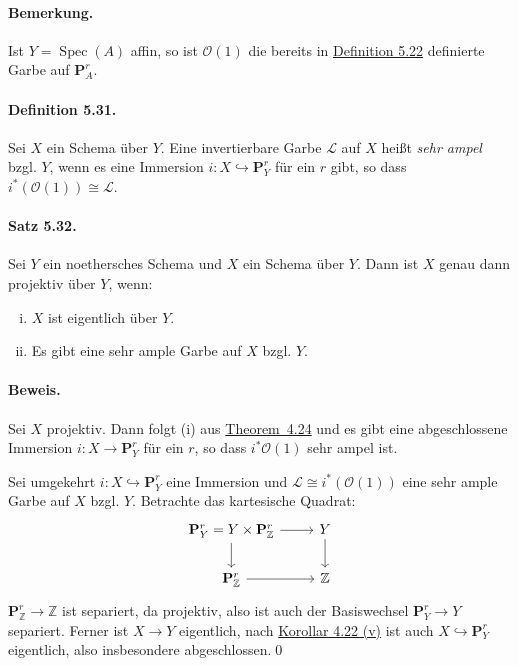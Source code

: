 \paragraph{Bemerkung.} Ist $Y=\operatorname{Spec}(A)$ affin, so ist $\mathcal{O}(1)$ die bereits in \hyperref[5.22]{Definition 5.22} definierte Garbe auf $\mathbf{P}_A^r$.

\paragraph{Definition 5.31.}\label{5.31} Sei $X$ ein Schema über $Y$. Eine invertierbare Garbe $\mathcal{L}$ auf $X$ heißt \textit{sehr ampel} bzgl. $Y$, wenn es eine Immersion $i:X\hookrightarrow\mathbf{P}_Y^r$ für ein $r$ gibt, so dass $i^\ast(\mathcal{O}(1))\cong\mathcal{L}$.

\paragraph{Satz 5.32.}\label{5.32} Sei $Y$ ein noethersches Schema und $X$ ein Schema über $Y$. Dann ist $X$ genau dann projektiv über $Y$, wenn:
\begin{enumerate}[(i)]
\item $X$ ist eigentlich über $Y$.
\item Es gibt eine sehr ample Garbe auf $X$ bzgl. $Y$.
\end{enumerate}

\paragraph{Beweis.} Sei $X$ projektiv. Dann folgt (i) aus \hyperref[4.24]{Theorem~4.24} und es gibt eine abgeschlossene Immersion $i:X\to\mathbf{P}_Y^r$ für ein $r$, so dass $i^\ast\mathcal{O}(1)$ sehr ampel ist.

Sei umgekehrt $i:X\hookrightarrow\mathbf{P}_Y^r$ eine Immersion und $\mathcal{L}\cong i^\ast(\mathcal{O}(1))$ eine sehr ample Garbe auf $X$ bzgl. $Y$. Betrachte das kartesische Quadrat:
\[\begin{tikzcd}
\mathbf{P}^r_Y = Y\times \mathbf{P}_\mathbb{Z}^r \ar[r]\ar[d]& Y\ar[d]\\
\mathbf{P}_\mathbb{Z}^r\ar[r] & \mathbb{Z}
\end{tikzcd} \]
$\mathbf{P}_\mathbb{Z}^r\to\mathbb{Z}$ ist separiert, da projektiv, also ist auch der Basiswechsel $\mathbf{P}_Y^r\to Y$ separiert. Ferner ist $X\to Y$ eigentlich, nach \hyperref[4.22]{Korollar 4.22 (v)} ist auch $X\hookrightarrow \mathbf{P}_Y^r$ eigentlich, also insbesondere abgeschlossen.\qed


